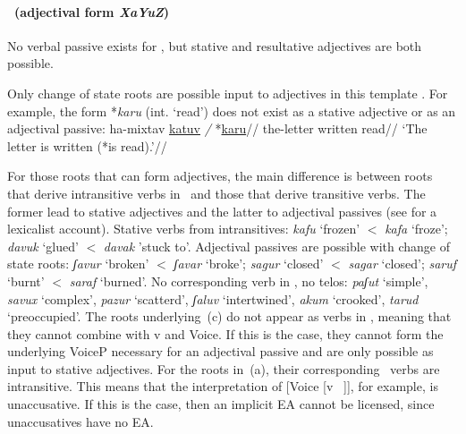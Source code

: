 


\paragraph*{\tkal~(adjectival form \emph{XaYuZ})}
No verbal passive exists for \tkal, but stative and resultative adjectives are both possible.

Only change of state roots are possible input to adjectives in this template \citep{doron00}. For example, the form *\emph{karu} (int. `read') does not exist as a stative adjective or as an adjectival passive:
\ex
  \begingl
    \gla ha-mixtav \underline{katuv} \emph{/} *\underline{karu}//
    \glb the-letter written {} read//
    \glft `The letter is written (*is read).'//
  \endgl
\xe

For those roots that can form adjectives, the main difference is between roots that derive intransitive verbs in \tkal~and those that derive transitive verbs. The former lead to stative adjectives and the latter to adjectival passives {(see }\citealt{meltzerasscher11}{ for a lexicalist account)}.
\pex 
  \a Stative verbs from intransitives: \emph{kafu} `frozen' $<$ \emph{kafa} `froze'; \emph{davuk} `glued' $<$ \emph{davak} 'stuck to'. %
  \a Adjectival passives are possible with change of state roots: \emph{ʃavur} `broken' $<$ \emph{ʃavar} `broke'; \emph{sagur} `closed' $<$ \emph{sagar} `closed'; \emph{saruf} `burnt' $<$ \emph{saraf} `burned'. %
  \a No corresponding verb in \tkal, no telos: \emph{paʃut} `simple', \emph{savux} `complex', \emph{pazur} `scatterd', \emph{ʃaluv} `intertwined', \emph{akum} `crooked', \emph{tarud} `preoccupied'.
  \xe
The roots underlying~(\lastx c) do not appear as verbs in \tkal, meaning that they cannot combine with v and Voice. If this is the case, they cannot form the underlying VoiceP necessary for an adjectival passive and are only possible as input to stative adjectives. For the roots in~(\lastx a), their corresponding \tkal~verbs are intransitive. This means that the interpretation of [Voice [v ~\!]], for example, is unaccusative. If this is the case, then an implicit EA cannot be licensed, since unaccusatives have no EA.


